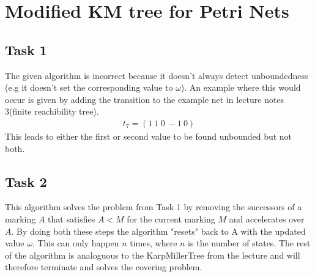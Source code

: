 \section{Modified KM tree for Petri Nets}

\subsection{Task 1}
The given algorithm is incorrect because it doesn't always detect unboundedness (e.g it doesn't set the corresponding value to $\omega$).
An example where this would occur is given by adding the transition to the example net in lecture notes 3(finite reachibility tree).
\begin{align*}
t_7 = (1~1~0~-1~0) 
\end{align*}
This leads to either the first or second value to be found unbounded but not both.

\subsection{Task 2}
This algorithm solves the problem from Task 1 by removing the successors of a marking $A$ that satisfies $A < M$ for the current marking $M$ and accelerates over $A$. By doing both these steps the algorithm "resets" back to A with the updated value $\omega$. This can only happen $n$ times, where $n$ is the number of states. The rest of the algorithm is analoguous to the KarpMillerTree from the lecture and will therefore terminate and solves the covering problem.  